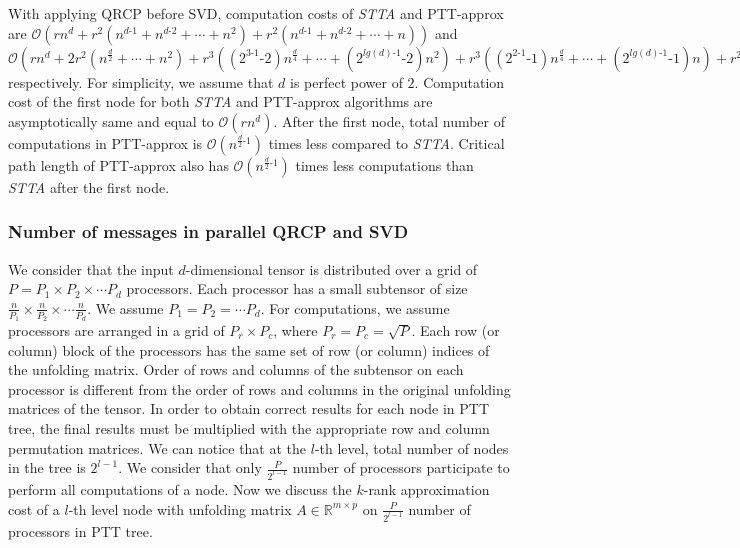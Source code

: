 \documentclass[sigconf]{acmart}
\newcommand{\otta}{{\it STTA}\xspace}
\begin{document}
With applying QRCP before SVD, computation costs of \otta and PTT-approx are $\mathcal{O}(rn^d + r^2 (n^{d\text{-}1} + n^{d\text{-}2} + \cdots  + n^2) + r^2 (n^{d\text{-}1} + n^{d\text{-}2} + \cdots + n))$ and $\mathcal{O}(rn^d + 2r^2(n^\frac{d}{2}+\cdots+n^2) + r^3 ((2^{3\text{-}1}\text{-}2)n^\frac{d}{4} + \cdots+ (2^{lg(d)\text{-}1}\text{-}2)n^2) + r^3((2^{2\text{-}1}\text{-}1)n^\frac{d}{4}+\cdots+(2^{lg(d)\text{-}1}\text{-}1)n) + r^2 (n^\frac{d}{2} +\cdots+n))$ respectively. For simplicity, we assume that $d$ is perfect power of $2$. Computation cost of the first node for both \otta and PTT-approx algorithms are asymptotically same and equal to $\mathcal{O}(rn^d)$. After the first node, total number of computations in PTT-approx is $\mathcal{O}(n^{\frac{d}{2}\text{-}1})$ times less compared to \otta. Critical path length of PTT-approx also has  $\mathcal{O}(n^{\frac{d}{2}\text{-}1})$ times less computations than \otta after the first node. 


\subsubsection{Number of messages in parallel QRCP and SVD}
We consider that the input $d$-dimensional tensor is distributed over a grid of $P = P_1 \times P_2\times\cdots P_d$ processors. Each processor has a small subtensor of size $\frac{n}{P_1}\times \frac{n}{P_2} \times \cdots \frac{n}{P_d}$. We assume $P_1=P_2=\cdots P_d$. For computations, we assume processors are arranged in a grid of $P_r \times P_c$, where $P_r=P_c=\sqrt{P}$. Each row (or column) block of the processors has the same set of row (or column) indices of the unfolding matrix. Order of rows and columns of the subtensor on each processor is different from the order of rows and columns in the original unfolding matrices of the tensor. In order to obtain correct results for each node in PTT tree, the final results must be multiplied with the appropriate row and column permutation matrices. We can notice that at the $l$-th level, total number of nodes in the tree is $2^{l-1}$. We consider that only $\frac{P}{2^{l-1}}$ number of processors participate to perform all computations of a node. Now we discuss the $k$-rank approximation cost of a $l$-th level node with unfolding matrix $A\in \mathbb{R}^{m\times p}$ on $\frac{P}{2^{l-1}}$ number of processors in PTT tree. 
\end{document}
